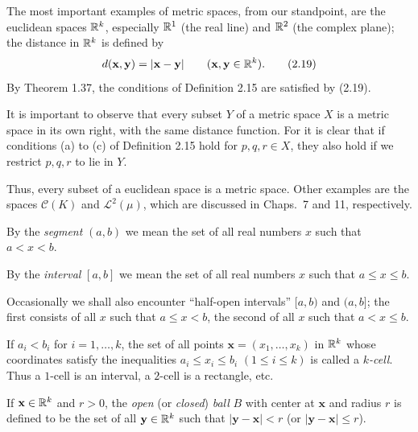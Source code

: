 The most important examples of metric spaces, from our standpoint, are the
euclidean spaces $\mathbb{R}^k$, especially $\mathbb{R}^1$ (the real line) and $\mathbb{R}^2$ (the
complex plane); the distance in $\mathbb{R}^k$ is defined by
\begin{equation}
  d(\mathbf{x},\mathbf{y}) = |\mathbf{x}-\mathbf{y}|
  \qquad (\mathbf{x},\mathbf{y} \in \mathbb{R}^k). \tag{2.19}
\end{equation}
By Theorem 1.37, the conditions of Definition 2.15 are satisfied by (2.19).

It is important to observe that every subset $Y$ of a metric space $X$ is a
metric space in its own right, with the same distance function. For it is clear
that if conditions (a) to (c) of Definition 2.15 hold for $p,q,r \in X$, they
also hold if we restrict $p,q,r$ to lie in $Y$.

Thus, every subset of a euclidean space is a metric space. Other examples are
the spaces $\mathscr{C}(K)$ and $\mathscr{L}^2(\mu)$, which are discussed in
Chaps.\ 7 and 11, respectively.

By the \emph{segment} $(a,b)$ we mean the set of all real numbers $x$ such that
$a < x < b$.

By the \emph{interval} $[a,b]$ we mean the set of all real numbers $x$ such
that $a \le x \le b$.

Occasionally we shall also encounter ``half-open intervals'' $[a,b)$ and
$(a,b]$; the first consists of all $x$ such that $a \le x < b$, the second of
all $x$ such that $a < x \le b$.

If $a_i < b_i$ for $i = 1,\dots,k$, the set of all points
$\mathbf{x} = (x_1,\dots,x_k)$ in $\mathbb{R}^k$ whose coordinates satisfy the
inequalities $a_i \le x_i \le b_i$ $(1 \le i \le k)$ is called a
\emph{$k$-cell}. Thus a $1$-cell is an interval, a $2$-cell is a rectangle,
etc.

If $\mathbf{x} \in \mathbb{R}^k$ and $r > 0$, the \emph{open} (or \emph{closed})
\emph{ball} $B$ with center at $\mathbf{x}$ and radius $r$ is defined to be the
set of all $\mathbf{y} \in \mathbb{R}^k$ such that $|\mathbf{y}-\mathbf{x}| < r$ (or
$|\mathbf{y}-\mathbf{x}| \le r$).

